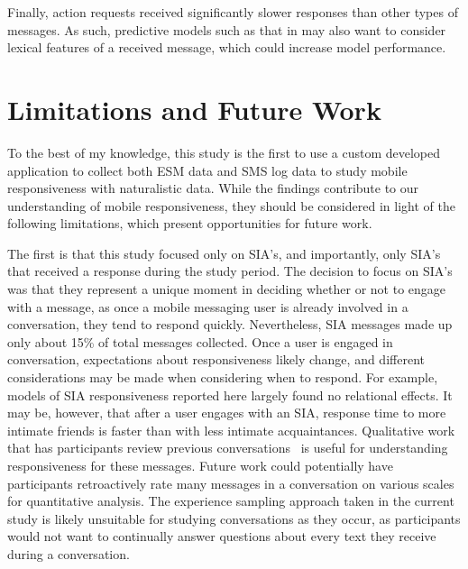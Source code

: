\documentclass[12pt]{nuthesis}	%
\begin{document}
Finally, action requests received significantly slower responses than other types of messages. As such, predictive models such as that in \citet{pielot2014didn} may also want to consider lexical features of a received message, which could increase model performance.

\section{Limitations and Future Work}

To the best of my knowledge, this study is the first to use a custom developed application to collect both ESM data and SMS log data to study mobile responsiveness with naturalistic data. While the findings contribute to our understanding of mobile responsiveness, they should be considered in light of the following limitations, which present opportunities for future work. 

The first is that this study focused only on SIA's, and importantly, only SIA's that received a response during the study period. The decision to focus on SIA's was that they represent a unique moment in deciding whether or not to engage with a message, as once a mobile messaging user is already involved in a conversation, they tend to respond quickly. Nevertheless, SIA messages made up only about 15\% of total messages collected. Once a user is engaged in conversation, expectations about responsiveness likely change, and different considerations may be made when considering when to respond. For example, models of SIA responsiveness reported here largely found no relational effects. It may be, however, that after a user engages with an SIA, response time to more intimate friends is faster than with less intimate acquaintances. Qualitative work that has participants review previous conversations~\citep[e.g.,][]{cui2016beyond} is useful for understanding responsiveness for these messages. Future work could potentially have participants retroactively rate many messages in a conversation on various scales for quantitative analysis. The experience sampling approach taken in the current study is likely unsuitable for studying conversations as they occur, as participants would not want to continually answer questions about every text they receive during a conversation.
\end{document}
